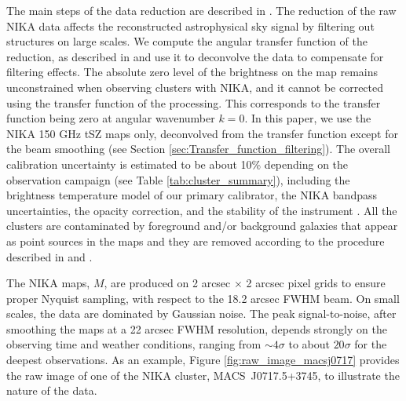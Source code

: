 \documentclass[twocolumn,traditabstract]{aa}
\begin{document}
The main steps of the data reduction are described in \cite{Adam2014,Adam2015}. The reduction of the raw NIKA data affects the reconstructed astrophysical sky signal by filtering out structures on large scales. We compute the angular transfer function of the reduction, as described in \cite{Adam2015} and use it to deconvolve the data to compensate for filtering effects. The absolute zero level of the brightness on the map remains unconstrained when observing clusters with NIKA, and it cannot be corrected using the transfer function of the processing. This corresponds to the transfer function being zero at angular wavenumber $k = 0$. In this paper, we use the NIKA 150 GHz tSZ maps only, deconvolved from the transfer function except for the beam smoothing (see Section \ref{sec:Transfer_function_filtering}). The overall calibration uncertainty is estimated to be about 10\% depending on the observation campaign (see Table \ref{tab:cluster_summary}), including the brightness temperature model of our primary calibrator, the NIKA bandpass uncertainties, the opacity correction, and the stability of the instrument \citep{Catalano2014}. All the clusters are contaminated by foreground and/or background galaxies that appear as point sources in the maps and they are removed according to the procedure described in \cite{Adam2015} and \cite{Adam2016a}. 

The NIKA maps, $M$, are produced on 2 arcsec $\times$ 2 arcsec pixel grids to ensure proper Nyquist sampling, with respect to the 18.2 arcsec FWHM beam. On small scales, the data are dominated by Gaussian noise. The peak signal-to-noise, after smoothing the maps at a 22 arcsec FWHM resolution, depends strongly on the observing time and weather conditions, ranging from $\sim 4 \sigma$ to about $20 \sigma$ for the deepest observations. As an example, Figure \ref{fig:raw_image_macsj0717} provides the raw image of one of the NIKA cluster, \mbox{MACS~J0717.5+3745}, to illustrate the nature of the data.
\end{document}
